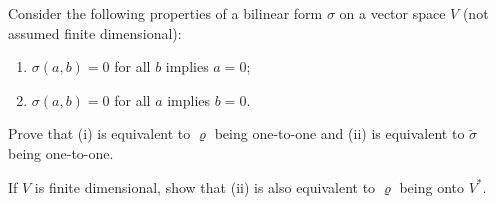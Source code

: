 Consider the following properties of a bilinear form $\sigma$ on a vector space $V$ (not assumed finite dimensional):

\begin{enumerate}
\item[(i)] $\sigma(a, b) = 0$ for all $b$ implies $a = 0$;
\item[(ii)] $\sigma(a, b) = 0$ for all $a$ implies $b = 0$.
\end{enumerate}

Prove that (i) is equivalent to $\varrho$ being one-to-one and (ii) is equivalent to $\tilde{\sigma}$ being one-to-one.

If $V$ is finite dimensional, show that (ii) is also equivalent to $\varrho$ being onto $V^*$.
